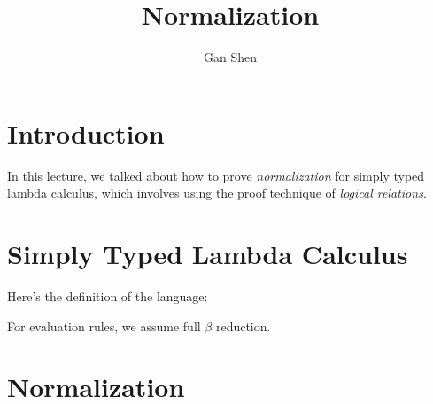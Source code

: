 \documentclass{notes}
\title{Normalization}
\author{Gan Shen}
\begin{document}
\maketitle

\section{Introduction}

In this lecture, we talked about how to prove \emph{normalization} for simply typed lambda calculus, which involves using the proof technique of \emph{logical relations}.

\section{Simply Typed Lambda Calculus}

Here's the definition of the language:
%
\begin{syntax}
  \category[Types]{\tau, \sigma}
  \alternative{\tau \rightarrow \sigma}

\end{syntax}
%
%
For evaluation rules, we assume full $\beta$ reduction.

\section{Normalization}
\end{document}
